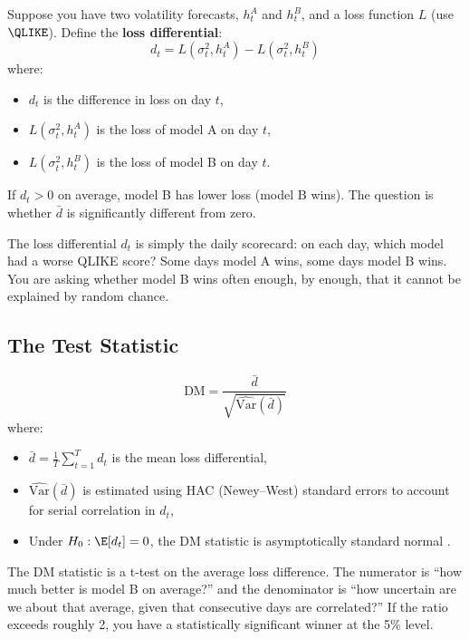 Suppose you have two volatility forecasts, $h^A_t$ and $h^B_t$, and a loss function $L$ (use $\QLIKE$).
Define the \textbf{loss differential}:
\begin{equation}
\label{eq:dm-diff}
d_t = L(\sigma^2_t, h^A_t) - L(\sigma^2_t, h^B_t)
\end{equation}
where:
\begin{itemize}[nosep]
  \item $d_t$ is the difference in loss on day $t$,
  \item $L(\sigma^2_t, h^A_t)$ is the loss of model A on day $t$,
  \item $L(\sigma^2_t, h^B_t)$ is the loss of model B on day $t$.
\end{itemize}

If $d_t > 0$ on average, model B has lower loss (model B wins).
The question is whether $\bar{d}$ is significantly different from zero.

\begin{intuition}
The loss differential $d_t$ is simply the daily scorecard: on each day, which model had a worse QLIKE score?
Some days model A wins, some days model B wins.
You are asking whether model B wins often enough, by enough, that it cannot be explained by random chance.
\end{intuition}

\subsection{The Test Statistic}

\begin{equation}
\label{eq:dm-stat}
\text{DM} = \frac{\bar{d}}{\sqrt{\widehat{\text{Var}}(\bar{d})}}
\end{equation}
where:
\begin{itemize}[nosep]
  \item $\bar{d} = \frac{1}{T}\sum_{t=1}^T d_t$ is the mean loss differential,
  \item $\widehat{\text{Var}}(\bar{d})$ is estimated using HAC (Newey--West) standard errors to account for serial correlation in $d_t$,
  \item Under $H_0: \E[d_t] = 0$, the DM statistic is asymptotically standard normal \citep{DieboldMariano1995}.
\end{itemize}

\begin{intuition}
The DM statistic is a t-test on the average loss difference.
The numerator is ``how much better is model B on average?'' and the denominator is ``how uncertain are we about that average, given that consecutive days are correlated?''
If the ratio exceeds roughly 2, you have a statistically significant winner at the 5\% level.
\end{intuition}

